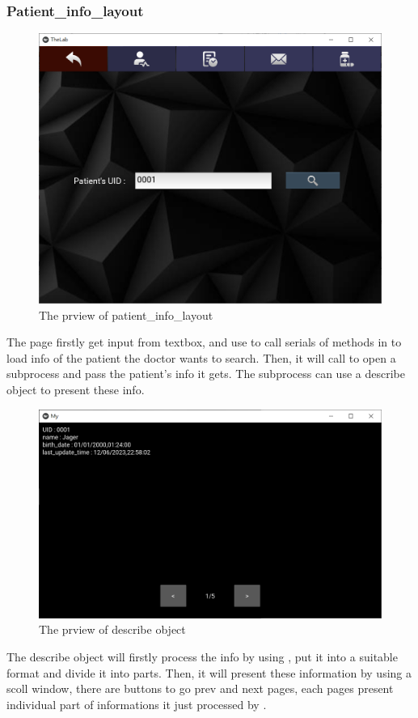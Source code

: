 \documentclass{article}
\begin{document}
\subsubsection*{Patient\_info\_layout}
\begin{figure}[h]
  \centering
  \includegraphics[scale = 0.5]{asset/doctor_gui/frontend_search_patient.png}
  \caption{The prview of patient\_info\_layout}
  \label{fig:frontend_search_patient}
\end{figure}
The page firstly get input from textbox, and use  to call serials of methods in  to load info of the patient the doctor wants to search. 
Then, it will call  to open a subprocess and pass the patient's info it gets. The subprocess can use a describe object to present these info.
\begin{figure}[h]
  \centering
  \includegraphics[scale = 0.5]{asset/doctor_gui/frontend_patient_info.png}
  \caption{The prview of describe object}
  \label{fig:frontend_patient_info}
\end{figure}
The describe object will firstly process the info by using , put it into a suitable format and divide it into parts.
Then, it will present these information by using a scoll window, there are buttons to go prev and next pages, each pages present individual part of informations it just processed by .
\end{document}
